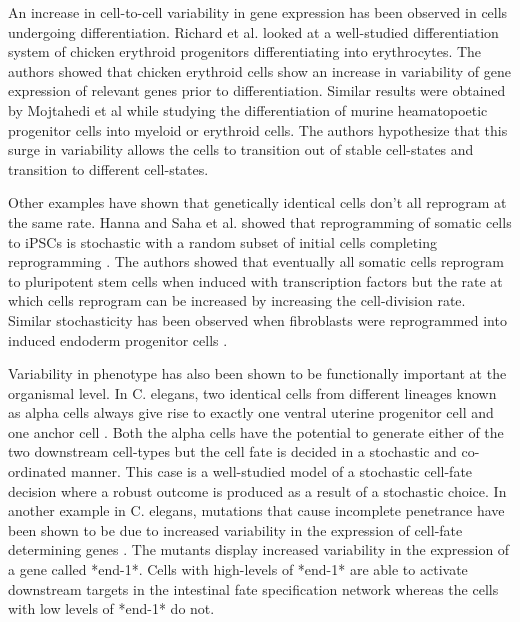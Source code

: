 An increase in cell-to-cell variability in gene expression has been observed in cells undergoing differentiation. Richard et al.  \cite{richard_single-cell-based_2016} looked at a well-studied differentiation system of chicken erythroid progenitors differentiating into erythrocytes. The authors showed that chicken erythroid cells show an increase in variability of gene expression of relevant genes prior to differentiation. Similar results were obtained by Mojtahedi et al  \cite{mojtahedi_cell_2016} while studying the differentiation of murine heamatopoetic progenitor cells into myeloid or erythroid cells. The authors hypothesize that this surge in variability allows the cells to transition out of stable cell-states and transition to different cell-states. 


Other examples have shown that genetically identical cells don't all reprogram at the same rate. Hanna and Saha et al. showed that reprogramming of somatic cells to iPSCs is stochastic with a random subset of initial cells completing reprogramming  \cite{hanna_direct_2009}. The authors showed that eventually all somatic cells reprogram to pluripotent stem cells when induced with transcription factors but the rate at which cells reprogram can be increased by increasing the cell-division rate. Similar stochasticity has been observed when fibroblasts were reprogrammed into induced endoderm progenitor cells \cite{biddy_single-cell_2018}.

Variability in phenotype has also been shown to be functionally important at the organismal level. In C. elegans, two identical cells from different lineages known as alpha cells always give rise to exactly one ventral uterine progenitor cell and one anchor cell \cite{seydoux_cell_1989}. Both the alpha cells have the potential to generate either of the two downstream cell-types but the cell fate is decided in a stochastic and co-ordinated manner. This case is a well-studied model of a stochastic cell-fate decision where a robust outcome is produced as a result of a stochastic choice. In another example in C. elegans, mutations that cause incomplete penetrance have been shown to be due to increased variability in the expression of cell-fate determining genes  \cite{raj_variability_2010}.  The mutants display increased variability in the expression of a gene called *end-1*. Cells with high-levels of *end-1* are able to activate downstream targets in the intestinal fate specification network whereas the cells with low levels of *end-1* do not. 

